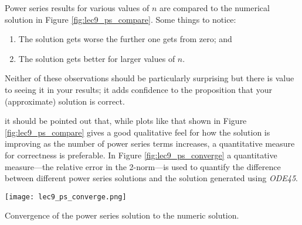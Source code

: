 Power series results for various values of $n$ are compared to the numerical solution in Figure \ref{fig:lec9_ps_compare}.  Some things to notice:
\begin{enumerate}
\item The solution gets worse the further one gets from zero; and
\item The solution gets better for larger values of $n$.  
\end{enumerate}
Neither of these observations should be particularly surprising but there is value to seeing it in your results; it adds confidence to the proposition that your (approximate) solution is correct.

 it should be pointed out that, while plots like that shown in Figure \ref{fig:lec9_ps_compare} gives a good qualitative feel for how the solution is improving as the number of power series terms increases, a quantitative measure for correctness is preferable.  In Figure \ref{fig:lec9_ps_converge} a quantitative measure---the relative error in the 2-norm---is used to quantify the difference between different power series solutions and the solution generated using \emph{ODE45}. 
\begin{marginfigure}
\texttt{[image: lec9\_ps\_converge.png]}
\caption{Convergence of the power series solution to the numeric solution.}
\label{fig:lec9_ps_converge}
\end{marginfigure}   

